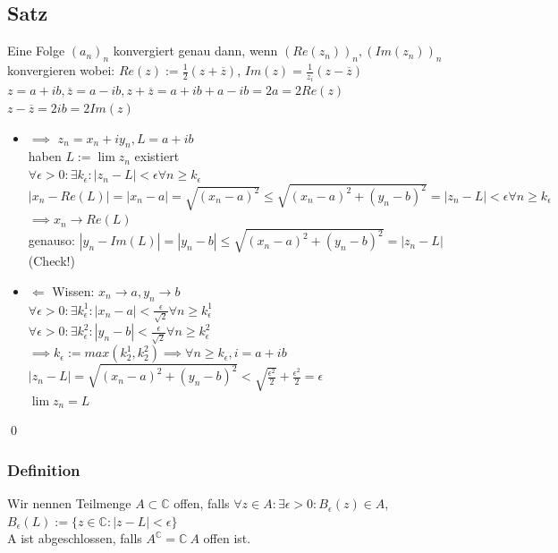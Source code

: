 \documentclass[fleqn]{scrbook}
\newcommand{\qq}[1]{\glqq #1\grqq}
\renewenvironment{proof}{{\bfseries Beweis }}{\qed}
\begin{document}
\subsection{Satz} Eine Folge $(a_n)_n$ konvergiert genau dann, wenn $(Re(z_n))_n, (Im(z_n))_n$ konvergieren wobei: $Re(z):=\frac{1}{2}(z + \overline{z})$, $Im(z) = \frac{1}{z_i}(z - \overline{z})$\\
$z = a + ib, \overline{z} = a - ib, z + \overline{z} = a + ib + a - ib = 2a = 2Re(z)$\\
$z-\overline{z} = 2ib = 2Im(z)$\\
\begin{proof}
\begin{itemize}
\item \qq{$\implies$} $z_n = x_n + iy_n, L = a + ib$\\
haben $L:= \lim z_n$ existiert\\
$\forall \epsilon > 0:\exists k_\epsilon: |z_n - L| < \epsilon \forall n \geq k_\epsilon$\\
$|x_n - Re(L)| = |x_n -a| = \sqrt{(x_n - a)^2} \leq \sqrt{(x_n - a)^2 + (y_n -b)^2} = |z_n - L| < \epsilon \forall n\geq k_\epsilon$\\
$\implies x_n \rightarrow Re(L)$\\
genauso: $|y_n - Im(L)| = |y_n - b| \leq \sqrt{(x_n - a)^2 + (y_n - b)^2} = |z_n - L|$ (Check!)
\item \qq{$\Leftarrow$} Wissen: $x_n \rightarrow a, y_n \rightarrow b$\\
$\forall \epsilon > 0: \exists k^1_\epsilon :|x_n -a | < \frac{\epsilon}{\sqrt{2}} \forall n \geq k^1_\epsilon$\\
$\forall \epsilon > 0: \exists k^2_\epsilon :|y_n - b| < \frac{\epsilon}{\sqrt{2}} \forall n \geq k^2_\epsilon$\\
$\implies k_\epsilon := max(k^1_2, k^2_2) \implies \forall n \geq k_\epsilon, i = a + ib$\\
$|z_n - L| = \sqrt{(x_n-a)^2 + (y_n - b)^2} < \sqrt{\frac{\epsilon^2}{2}} + \frac{\epsilon^2}{2} = \epsilon$\\
$\lim z_n = L$
\end{itemize}
\end{proof}
\subsubsection{Definition} Wir nennen Teilmenge $A \subset \mathbb{C}$ offen, falls $\forall z \in A: \exists \epsilon > 0 :B_\epsilon(z) \in A$, $B_\epsilon(L):=\{z \in \mathbb{C}: |z-L|<\epsilon \}$\\
A ist abgeschlossen, falls $A^\mathbb{C} = \mathbb{C} \ A$ offen ist.
\end{document}
